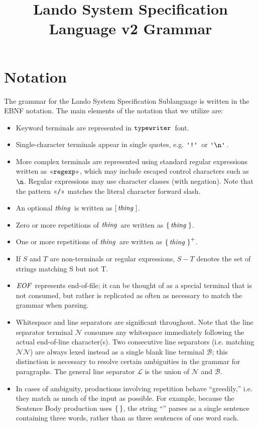\documentclass{article}
\newcommand{\gnn}{\ensuremath{\mathcal{N}}}
\newcommand{\gnl}{\ensuremath{\mathcal{L}}}
\newcommand{\gnb}{\ensuremath{\mathcal{B}}}
\begin{document}
\title{Lando System Specification Language v2 Grammar}
\maketitle

\section{Notation}

The grammar for the Lando System Specification Sublanguage is written in the EBNF notation. The main elements of the notation that we utilize are:
\begin{itemize}
  \item Keyword terminals are represented in $\mathop{\texttt{typewriter}}\,$ font. 
  \item Single-character terminals appear in single quotes, e.g. $\gtkc{!}$ or $\gtkc{\gtesc{n}}$.
  \item More complex terminals are represented using standard regular expressions written as $\gtregex{regexp}$, which may include escaped control characters such as $\texttt{\textbackslash {n}}$. Regular expressions may use character classes (with negation). Note that the pattern $\gtregex{/}$ matches the literal character forward slash.
  \item An optional $\mathop{\textit{thing}}\,$ is written as $\mathop{\operatorname{[} \mathop{\mathop{\textit{thing}}\,} \operatorname{]}}$.
  \item {Zero or more repetitions of $\mathop{\textit{thing}}\,$ are written as $\mathop{\operatorname{\{} \mathop{\textit{thing}}\, \operatorname{\}}}$}.
  \item One or more repetitions of $\mathop{\textit{thing}}\,$ are written as $\mathop{\operatorname{\{} \mathop{\textit{thing}}\, \operatorname{\}}^+}$.
  \item If $S$ and $T$ are non-terminals or regular expressions, $S - T$ denotes the set of strings matching S but not T.
  \item $\mathop{\textit{EOF}}\,$ represents end-of-file; it can be thought of as a special terminal that is not consumed, but rather is replicated as often as necessary to match the grammar when parsing.
  \item Whitespace and line separators are significant throughout. Note that the line separator terminal $\gnn$ consumes any whitespace immediately following the actual end-of-line character(s). Two consecutive line separators (i.e. matching $\gnn\gnn$) are always lexed instead as a single blank line terminal $\gnb$;
    this distinction is necessary to resolve certain ambiguities in the grammar for paragraphs.
    The general line separator $\gnl$ is the union of $\gnn$ and $\gnb$.
 \item In cases of ambiguity, productions involving repetition behave ``greedily,'' i.e. they match as much of the input as possible.
    For example, because the Sentence Body production uses $\mathop{\operatorname{\{}  \operatorname{\}}}$,  the string ``'' parses as a single sentence
    containing three words, rather than as three sentences of one word each.
\end{itemize}
\end{document}
